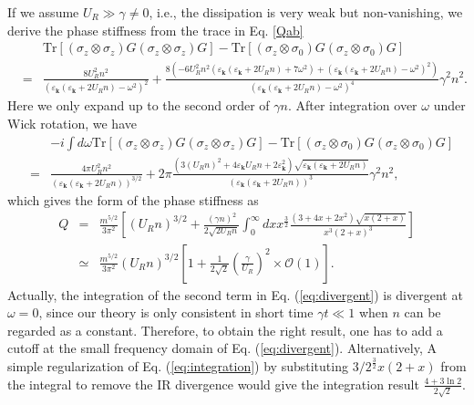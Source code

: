 \documentclass[aps,superscriptaddress,notitlepage,longbibliography]{revtex4-1}
\begin{document}
If we assume $U_{R}\gg\gamma\neq0$, i.e., the dissipation is very
weak but non-vanishing, we derive the phase stiffness from the trace
in Eq. \eqref{Qab} 
\begin{eqnarray}
 &  & \text{Tr}[(\sigma_{z}\otimes\sigma_{z})G(\sigma_{z}\otimes\sigma_{z})G]-\text{Tr}[(\sigma_{z}\otimes\sigma_{0})G(\sigma_{z}\otimes\sigma_{0})G]\nonumber \\
 & = & \frac{8U_{R}^{2}n^{2}}{(\varepsilon_{\bm{k}}(\varepsilon_{\bm{k}}+2U_{R}n)-\omega^{2})^{2}}+\frac{8(-6U_{R}^{2}n^{2}(\varepsilon_{\bm{k}}(\varepsilon_{\bm{k}}+2U_{R}n)+7\omega^{2})+(\varepsilon_{\bm{k}}(\varepsilon_{\bm{k}}+2U_{R}n)-\omega^{2})^{2})}{(\varepsilon_{\bm{k}}(\varepsilon_{\bm{k}}+2U_{R}n)-\omega^{2})^{4}}\gamma^{2}n^{2}.\label{eq:divergent}
\end{eqnarray}
Here we only expand up to the second order of $\gamma n$. After integration
over $\omega$ under Wick rotation, we have 
\begin{eqnarray}
 &  & -i\int d\omega\text{Tr}[(\sigma_{z}\otimes\sigma_{z})G(\sigma_{z}\otimes\sigma_{z})G]-\text{Tr}[(\sigma_{z}\otimes\sigma_{0})G(\sigma_{z}\otimes\sigma_{0})G]\nonumber \\
 & = & \frac{4\pi U_{R}^{2}n^{2}}{(\varepsilon_{\bm{k}}(\varepsilon_{\bm{k}}+2U_{R}n))^{3/2}}+2\pi\frac{(3(U_{R}n)^{2}+4\varepsilon_{\bm{k}}U_{R}n+2\varepsilon_{\bm{k}}^{2})\sqrt{\varepsilon_{\bm{k}}(\varepsilon_{\bm{k}}+2U_{R}n)}}{(\varepsilon_{\bm{k}}(\varepsilon_{\bm{k}}+2U_{R}n))^{3}}\gamma^{2}n^{2},
\end{eqnarray}
which gives the form of the phase stiffness as 
\begin{eqnarray}
Q & = & \frac{m^{5/2}}{3\pi^{2}}\left[(U_{R}n)^{3/2}+\frac{(\gamma n)^{2}}{2\sqrt{2U_{R}n}}\int_{0}^{\infty}dxx^{\frac{3}{2}}\frac{(3+4x+2x^{2})\sqrt{x(2+x)}}{x^{3}(2+x)^{3}}\right]\nonumber \\
 & \simeq & \frac{m^{5/2}}{3\pi^{2}}(U_{R}n)^{3/2}\left[1+\frac{1}{2\sqrt{2}}\left(\frac{\gamma}{U_{R}}\right)^{2}\times\mathcal{O}(1)\right].\label{eq:integration}
\end{eqnarray}
Actually, the integration of the second term in Eq. (\ref{eq:divergent})
is divergent at $\omega=0$, since our theory is only consistent in
short time $\gamma t\ll1$ when $n$ can be regarded as a constant.
Therefore, to obtain the right result, one has to add a cutoff at
the small frequency domain of Eq. (\ref{eq:divergent}). Alternatively,
A simple regularization of Eq. (\ref{eq:integration}) by substituting
$3/2^{\frac{3}{2}}x(2+x)$ from the integral to remove the IR divergence
would give the integration result $\frac{4+3\ln2}{2\sqrt{2}}$.
\end{document}
